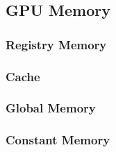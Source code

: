 \subsection{GPU Memory}\label{gpu:sec:mem}
%
\subsubsection{Registry Memory}\label{gpu:ssec:reg}
%
\subsubsection{Cache}\label{gpu:ssec:cache}
%
\subsubsection{Global Memory}\label{gpu:ssec:gm}
%
\subsubsection{Constant Memory}\label{gpu:ssec:cm}
